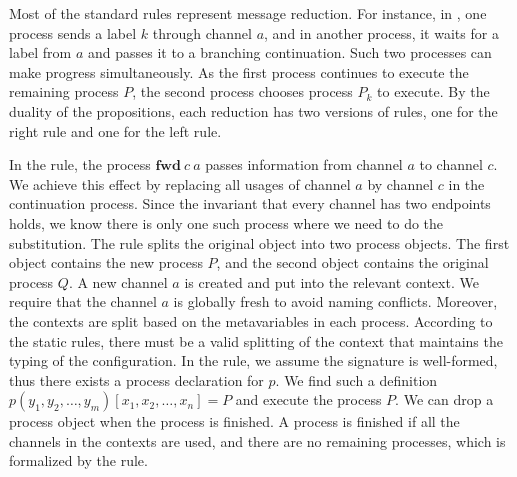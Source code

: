 \documentclass[12pt, openany]{memoir}
\newcommand*{\fwd}[2]{\textbf{fwd}\ #1\ #2}
\begin{document}
Most of the standard rules represent message reduction. 
For instance, in , one process sends a label $k$ through channel $a$, and in another process, 
it waits for a label from $a$ and passes it to a branching continuation. Such two processes can make progress simultaneously. 
As the first process continues to execute the remaining process $P$, the second process chooses process $P_k$ to execute. 
By the duality of the propositions, each reduction has two versions of rules, one for the right rule and one for the left rule.

In the  rule, the process $\fwd{c}{a}$ passes information from channel $a$ to channel $c$. 
We achieve this effect by replacing all usages of channel $a$ by channel $c$ in the continuation process. 
Since the invariant that every channel has two endpoints holds, we know there is only one such process where we need to do the substitution. 
The  rule splits the original object into two process objects. The first object contains the new process $P$, 
and the second object contains the original process $Q$. A new channel $a$ is created and put into the relevant context. 
We require that the channel $a$ is globally fresh to avoid naming conflicts. Moreover, the contexts are split based on the metavariables in each process. 
According to the static rules, there must be a valid splitting of the context that maintains the typing of the configuration. 
In the  rule, we assume the signature is well-formed, thus there exists a process declaration for $p$. 
We find such a definition $p (y_1, y_2, \ldots, y_m) [x_1, x_2, \ldots, x_n] = P$ and execute the process $P$. 
We can drop a process object when the process is finished. A process is finished if all the channels in the contexts are used, 
and there are no remaining processes, which is formalized by the  rule.
\end{document}
